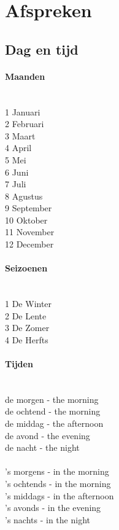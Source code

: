 \documentclass[a4paper,14pt]{extarticle}
\begin{document}
\section{Afspreken}
\subsection{Dag en tijd}
\begin{paracol}{2}
\paragraph{Maanden}
\hfill \\
1 Januari \\
2 Februari \\
3 Maart \\
4 April \\
5 Mei \\
6 Juni \\
7 Juli \\
8 Agustus \\
9 September \\
10 Oktober \\
11 November \\
12 December \\
\paragraph{Seizoenen}
\hfill \\
1 De Winter \\
2 De Lente \\
3 De Zomer \\
4 De Herfts \\
\paragraph{Tijden}
\hfill \\
de morgen  - the morning \\
de ochtend - the morning \\
de middag - the afternoon \\
de avond - the evening \\
de nacht - the night \\
\\
’s morgens - in the morning \\
’s ochtends - in the morning \\
’s middags - in the afternoon \\
’s avonds - in the evening \\
’s nachts - in the night \\
\switchcolumn

\end{paracol}
\end{document}
